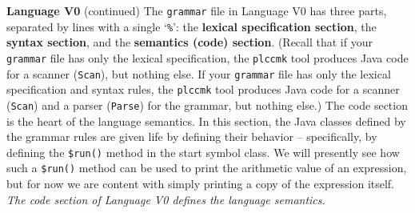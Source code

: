 \begin{minipage}[t]{\sw}
\slidenumber
\LARGE
{\bf Language V0} (continued)\exx
The \verb'grammar' file in Language V0
has three parts, separated by lines with a single `\verb'%'':
the {\bf lexical specification section},
the {\bf syntax section},
and the {\bf semantics (code) section}.\exx
(Recall that if your \verb'grammar' file has only the lexical specification,
the \verb'plccmk' tool produces Java code
for a scanner (\verb'Scan'),
but nothing else.
If your \verb'grammar' file has only the lexical specification and syntax rules,
the \verb'plccmk' tool produces Java code 
for a scanner (\verb'Scan') and a parser (\verb'Parse') for the grammar,
but nothing else.)\exx
The code section is the heart of the language semantics.
In this section, the Java classes defined by the grammar rules
are given life by defining their behavior --
specifically, by defining the \verb'$run()' method
in the start symbol class.
We will presently see how such a \verb'$run()' method can be used
to print the arithmetic value of an expression,
but for now we are content with simply printing
a copy of the expression itself.\exx
{\em The code section of Language V0 defines the language semantics.}
\end{minipage}
\clearpage

